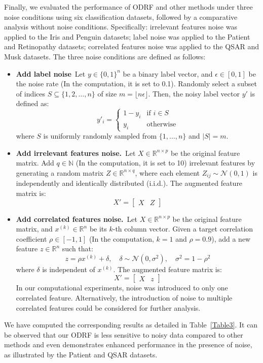 {
 Finally, we evaluated the performance of ODRF and other methods under three noise conditions using six classification datasets, followed by a comparative analysis without noise conditions. Specifically: irrelevant features noise was applied to the Iris and Penguin datasets; label noise was applied to the Patient and Retinopathy datasets; correlated features noise was applied to the QSAR and Musk datasets. The three noise conditions are defined as follows:
}
\begin{itemize}

	\item {\bf Add label noise}\
	Let \( y \in \{0,1\}^n \) be a binary label vector, and \( \epsilon \in [0,1] \) be the noise rate (In the computation, it is set to 0.1). Randomly select a subset of indices \( S \subseteq \{1, 2, \dots, n\} \) of size \( m = \lfloor n \epsilon \rfloor \). Then, the noisy label vector \( y' \) is defined as:
	\[
	y'_i = \begin{cases} 
		1 - y_i & \text{if } i \in S \\
		y_i & \text{otherwise}
	\end{cases}
	\]
	where \( S \) is uniformly randomly sampled from \( \{1, \dots, n\} \) and \( |S| = m \).

	\item {\bf Add irrelevant features noise.}\  Let \( X \in \mathbb{R}^{n \times p} \) be the original feature matrix. Add \( q \in \mathbb{N} \) (In the computation, it is set to 10) irrelevant features by generating a random matrix \( Z \in \mathbb{R}^{n \times q} \), where each element \( Z_{ij} \sim \mathcal{N}(0, 1) \) is independently and identically distributed (i.i.d.). The augmented feature matrix is:
	\[
	X' = \begin{bmatrix} X & Z \end{bmatrix}
	\]

	\item {\bf Add correlated features noise.}\ Let \( X \in \mathbb{R}^{n \times p} \) be the original feature matrix, and \( x^{(k)} \in \mathbb{R}^n \) be its $k$-th column vector. Given a target correlation coefficient \( \rho \in [-1,1] \) (In the computation, $k=1$ and $\rho=0.9$), add a new feature \( z \in \mathbb{R}^n \) such that:
	\[
	z = \rho x^{(k)} + \delta, \quad \delta \sim \mathcal{N}(0, \sigma^2), \quad \sigma^2 = 1 - \rho^2
	\]
	where \( \delta \) is independent of \( x^{(k)} \). The augmented feature matrix is:
	\[
	X' = \begin{bmatrix} X & z \end{bmatrix}
	\]
	In our computational experiments, noise was introduced to only one correlated feature. Alternatively, the introduction of noise to multiple correlated features could be considered for further analysis.
\end{itemize}
{
We have computed the corresponding results as detailed in Table~\ref{Table3}. It can be observed that our ODRF is less sensitive to noisy data compared to other methods and even demonstrates enhanced performance in the presence of noise, as illustrated by the Patient and QSAR datasets.}

